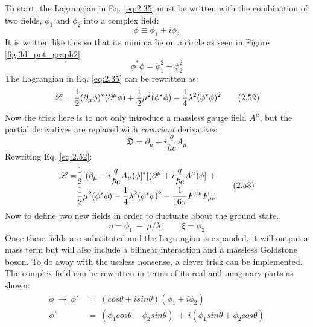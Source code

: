To start, the Lagrangian in Eq. \ref{eq:2.35} must be written with the combination of two fields,
$\phi_{1}$ and $\phi_{2}$ into a complex field:
%
\begin{equation}\label{eq:2.50}
    \phi \equiv \phi_{1} + \textit{i}\phi_{2}
\tag{2.50}
\end{equation}
%
It is written like this so that its minima lie on a circle as seen in Figure \ref{fig:3d_pot_graph2}:
%
\begin{equation}\label{eq:2.51}
    \phi^{*}\phi = \phi^{2}_{1} +\phi^{2}_{2}
\tag{2.51}
\end{equation}
%
The Lagrangian in Eq. \ref{eq:2.35} can be rewritten as:
%
\begin{equation}\label{eq:2.52}
    \mathscr{L} = \frac{1}2(\partial_{\mu}\phi)^{*}(\partial^{\mu}\phi)+\frac{1}2\mu^{2}(\phi^{*}\phi)-\frac{1}4\lambda^{2}(\phi^{*}\phi)^{2}
\tag{2.52}
\end{equation}
%
Now the trick here is to not only introduce a massless gauge field $A^{\mu}$, but the partial derivatives are replaced with 
\textit{covariant} derivatives.
%
\begin{equation}
    \mathfrak{D} = \partial_{\mu} + i\frac{q}{\hbar c}A_{\mu}
\end{equation}
%
Rewriting Eq. \ref{eq:2.52}:
%
\begin{equation}\label{eq:2.53}
\begin{split}
    \Lagr = &\frac{1}2[(\partial_{\mu} - i\frac{q}{\hbar c}A_{\mu})\phi]^{*}[(\partial^{\mu} + i\frac{q}{\hbar c}A^{\mu})\phi] \ + \\ 
    &\frac{1}2\mu^{2}(\phi^{*}\phi)  -  \frac{1}4\lambda^{2}(\phi^{*}\phi)^{2}  - \frac{1}{16\pi}F^{\mu\nu}F_{\mu\nu}
\end{split}
\tag{2.53}
\end{equation}
%
Now to define two new fields in order to fluctuate about the ground state.
%
\begin{equation}\label{eq:2.54}
    \eta = \phi_{1} \ - \ \mu/\lambda; \qquad \xi = \phi_{2}
\tag{2.54}
\end{equation}
%
Once these fields are substituted and the Lagrangian is expanded, it will output a mass term but will also include a bilinear interaction and 
a massless Goldstone boson. To do away with the useless nonsense, a clever trick can be implemented.
The complex field can be rewritten in terms of its real and imaginary parts as shown:
%
\begin{equation}\label{eq:2.55}
\begin{split}
    \phi  \ \rightarrow  \ \phi' \  &= \ (cos\theta + \textit{i}sin\theta)(\phi_{1}+\textit{i}\phi_{2}) \\
    \phi' \ &= \ (\phi_{1}cos\theta - \phi_{2}sin\theta) \ + \ \textit{i}(\phi_{1}sin\theta+\phi_{2}cos\theta) 
\end{split}
\tag{2.55}
\end{equation}
